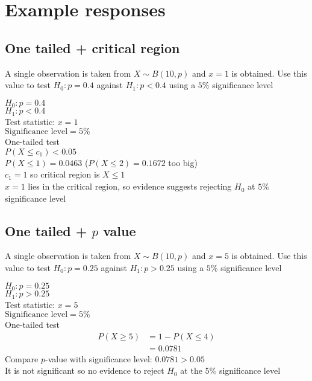 \section{Example responses}
\subsection{One tailed + critical region}
\begin{example}
    A single observation is taken from $X\sim B(10, p)$ and $x=1$ is obtained. Use this value to test $H_0: p=0.4$ against $H_1:p<0.4$ using a $5\%$ significance level
\end{example}

\begin{solution}
    $H_0: p=0.4$\\
    $H_1:p<0.4$\\
    Test statistic: $x=1$\\
    $\text{Significance level} = 5\%$\\
    One-tailed test\\
    $P(X \leq c_1) < 0.05$\\
    $P(X \leq 1) = 0.0463$ ($P(X \leq 2) = 0.1672$ too big)\\
    $c_1 = 1$ so critical region is $X\leq 1$\\
    $x=1$ lies in the critical region, so evidence suggests rejecting $H_0$ at $5\%$ significance level
\end{solution}

\subsection{One tailed + $p$ value}
\begin{example}
    A single observation is taken from $X\sim B(10, p)$ and $x=5$ is obtained. Use this value to test $H_0: p=0.25$ against $H_1:p>0.25$ using a $5\%$ significance level
\end{example}

\begin{solution}
    $H_0: p=0.25$\\
    $H_1:p>0.25$\\
    Test statistic: $x=5$\\
    $\text{Significance level} = 5\%$\\
    One-tailed test
    \begin{align*}
        P(X\geq 5) & = 1-P(X\leq 4) \\ &= 0.0781
    \end{align*}
    Compare $p$-value with significance level: $0.0781 > 0.05$\\
    It is not significant so no evidence to reject $H_0$ at the 5\% significance level
\end{solution}

